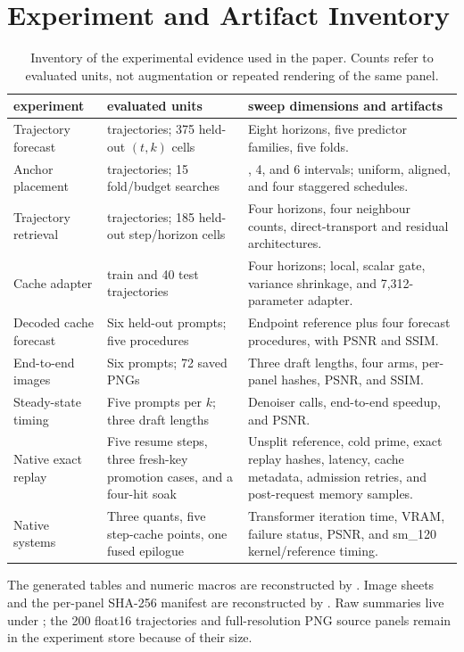 \documentclass[11pt,a4paper]{article}
\begin{document}
\section{Experiment and Artifact Inventory}
\label{app:inventory}

\begin{table}[H]
\centering
\footnotesize
\begin{tabularx}{\textwidth}{@{}l>{\raggedright\arraybackslash}p{}>{\raggedright\arraybackslash}X@{}}
\toprule
experiment & evaluated units & sweep dimensions and artifacts \\
\midrule
Trajectory forecast & 200 trajectories; 375 held-out $(t,k)$ cells & Eight horizons, five predictor families, five folds. \\
Anchor placement & 200 trajectories; 15 fold/budget searches & 3, 4, and 6 intervals; uniform, aligned, and four staggered schedules. \\
Trajectory retrieval & 200 trajectories; 185 held-out step/horizon cells & Four horizons, four neighbour counts, direct-transport and residual architectures. \\
Cache adapter & 160 train and 40 test trajectories & Four horizons; local, scalar gate, variance shrinkage, and 7,312-parameter adapter. \\
Decoded cache forecast & Six held-out prompts; five procedures & Endpoint reference plus four forecast procedures, with PSNR and SSIM. \\
End-to-end images & Six prompts; 72 saved PNGs & Three draft lengths, four arms, per-panel hashes, PSNR, and SSIM. \\
Steady-state timing & Five prompts per $k$; three draft lengths & Denoiser calls, end-to-end speedup, and PSNR. \\
Native exact replay & Five resume steps, three fresh-key promotion cases, and a four-hit soak & Unsplit reference, cold prime, exact replay hashes, latency, cache metadata, admission retries, and post-request memory samples. \\
Native systems & Three quants, five step-cache points, one fused epilogue & Transformer iteration time, VRAM, failure status, PSNR, and sm\_120 kernel/reference timing. \\
\bottomrule
\end{tabularx}
\caption{Inventory of the experimental evidence used in the paper. Counts refer
to evaluated units, not augmentation or repeated rendering of the same panel.}
\label{tab:experiment-inventory}
\end{table}

The generated tables and numeric macros are reconstructed by
. Image sheets and the per-panel SHA-256 manifest
are reconstructed by . Raw summaries live
under ; the 200 float16 trajectories and full-resolution
PNG source panels remain in the experiment store because of their size.


\end{document}

